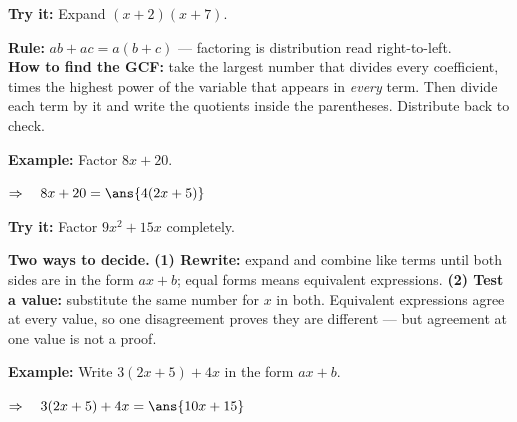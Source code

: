 \documentclass[12pt]{article}
\begin{document}
\begin{tryitbox}
\textbf{Try it:} Expand $(x + 2)(x + 7)$.\\[2pt]
\end{tryitbox}


\begin{formulabox}
\textbf{Rule:} $ab + ac = a(b + c)$ --- factoring is distribution read
right-to-left.\\[3pt]
\textbf{How to find the GCF:} take the largest number that divides every
coefficient, times the highest power of the variable that appears in
\emph{every} term. Then divide each term by it and write the quotients inside
the parentheses. Distribute back to check.
\end{formulabox}

\begin{examplebox}
\textbf{Example:} Factor $8x + 20$.

$\Rightarrow\quad 8x + 20 = \ans{4(2x + 5)}$
\end{examplebox}

\begin{tryitbox}
\textbf{Try it:} Factor $9x^2 + 15x$ completely.\\[2pt]
\end{tryitbox}


\begin{formulabox}
\textbf{Two ways to decide.} \textbf{(1) Rewrite:} expand and combine like
terms until both sides are in the form $ax + b$; equal forms means equivalent
expressions. \textbf{(2) Test a value:} substitute the same number for $x$ in
both. Equivalent expressions agree at every value, so one disagreement proves
they are different --- but agreement at one value is not a proof.
\end{formulabox}

\begin{examplebox}
\textbf{Example:} Write $3(2x + 5) + 4x$ in the form $ax + b$.

$\Rightarrow\quad 3(2x + 5) + 4x = \ans{10x + 15}$
\end{examplebox}
\end{document}
